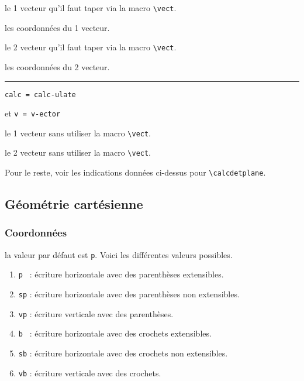 \documentclass[12pt,a4paper]{article}
\theoremstyle{definition}
\newcommand\env[1]{\texttt{#1}}
\newcommand\macro[1]{\env{\textbackslash{}#1}}
\newcommand\separation{
    \medskip
    \hfill\rule{0.5\textwidth}{0.75pt}\hfill
    \medskip
}
\newcommand\mwhyprefix[2]{%
    \texttt{#1 = #1-#2}%
}
\begin{document}
 le 1\ier{} vecteur qu'il faut taper via la macro \macro{vect}.

 les coordonnées du 1\ier{} vecteur.

 le 2\ieme{} vecteur qu'il faut taper via la macro \macro{vect}.

 les coordonnées du 2\ieme{} vecteur.


\separation


 \hfill \mwhyprefix{calc}{ulate}
                                  et \mwhyprefix{v}{ector}

 le 1\ier{} vecteur sans utiliser la macro \macro{vect}.

 le 2\ieme{} vecteur sans utiliser la macro \macro{vect}.

\medskip

Pour le reste, voir les indications données ci-dessus pour \macro{calcdetplane}.
%


\subsection{Géométrie cartésienne}

\subsubsection{Coordonnées} 



\label{tnsgeo-coordinates-tech}



\IDoption{} la valeur par défaut est \verb+p+. Voici les différentes valeurs possibles.
\begin{enumerate}
	\item \verb+p + : écriture horizontale avec des parenthèses extensibles.

	\item \verb+sp+ : écriture horizontale avec des parenthèses non extensibles.

	\item \verb+vp+ : écriture verticale avec des parenthèses.

	\item \verb+b + : écriture horizontale avec des crochets extensibles.

	\item \verb+sb+ : écriture horizontale avec des crochets non extensibles.

	\item \verb+vb+ : écriture verticale avec des crochets.
\end{enumerate}
\end{document}
